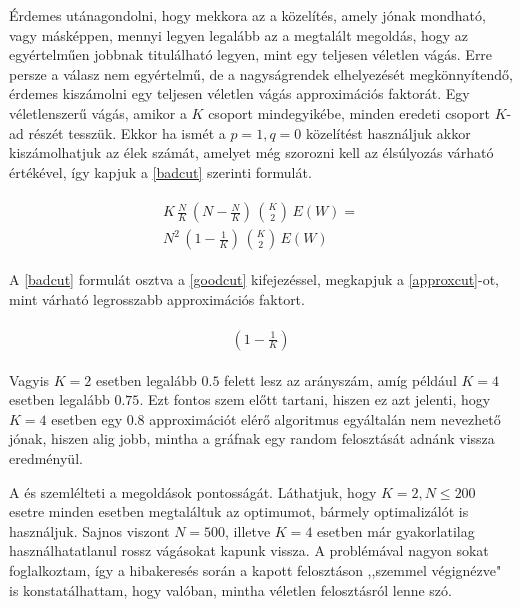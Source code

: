 Érdemes utánagondolni, hogy mekkora az a közelítés, amely jónak mondható, vagy másképpen, mennyi legyen legalább az a megtalált megoldás, hogy az egyértelműen jobbnak titulálható legyen, mint egy teljesen véletlen vágás. Erre persze a válasz nem egyértelmű, de a nagyságrendek elhelyezését megkönnyítendő, érdemes kiszámolni egy teljesen véletlen vágás approximációs faktorát. Egy véletlenszerű vágás, amikor a $K$ csoport mindegyikébe, minden eredeti csoport $K$-ad részét tesszük. Ekkor ha ismét a $p=1, q=0$ közelítést használjuk akkor kiszámolhatjuk az élek számát, amelyet még szorozni kell az élsúlyozás várható értékével, így kapjuk a \ref{badcut} szerinti formulát. 

\begin{align}
	\begin{split}
		K \, \frac{N}{K} \, \left( N-\frac{N}{K} \right) \, \binom{K}{2} \, E(W) = \label{badcut} \\
		 N^2 \, \left( 1 -\frac{1}{K} \right) \,\binom{K}{2} \, E(W)
	\end{split}
\end{align}

A \ref{badcut} formulát osztva a \ref{goodcut} kifejezéssel, megkapjuk a \ref{approxcut}-ot, mint várható legrosszabb approximációs faktort.

\begin{align}
	\begin{split}
		\left( 1 -\frac{1}{K} \right) \label{approxcut}
	\end{split}
\end{align}

Vagyis $K=2$ esetben legalább $0.5$ felett lesz az arányszám, amíg például $K=4$ esetben legalább $0.75$. Ezt fontos szem előtt tartani, hiszen ez azt jelenti, hogy $K=4$ esetben egy $0.8$ approximációt elérő algoritmus egyáltalán nem nevezhető jónak, hiszen alig jobb, mintha a gráfnak egy random felosztását adnánk vissza eredményül.

A  és  szemlélteti a megoldások pontosságát. Láthatjuk, hogy $K=2, N \leq 200$ esetre minden esetben megtaláltuk az optimumot, bármely optimalizálót is használjuk. Sajnos viszont $N=500$, illetve $K=4$ esetben már gyakorlatilag használhatatlanul rossz vágásokat kapunk vissza. A problémával nagyon sokat foglalkoztam, így a hibakeresés során a kapott felosztáson ,,szemmel végignézve" is konstatálhattam, hogy valóban, mintha véletlen felosztásról lenne szó.

